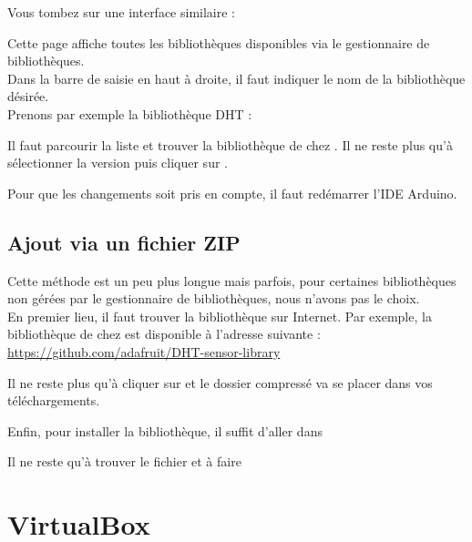 {  Vous tombez sur une interface similaire :


  Cette page affiche toutes les bibliothèques disponibles via le gestionnaire de bibliothèques.\\
  Dans la barre de saisie en haut à droite, il faut indiquer le nom de la bibliothèque désirée. \\
  Prenons par exemple la bibliothèque DHT :


  Il faut parcourir la liste et trouver la bibliothèque  de chez .
  Il ne reste plus qu'à sélectionner la version puis cliquer sur .

  Pour que les changements soit pris en compte, il faut redémarrer l'IDE  Arduino.


  \section{Ajout via un fichier ZIP}

  Cette méthode est un peu plus longue mais parfois, pour certaines bibliothèques non gérées par le gestionnaire de bibliothèques, nous n'avons pas le choix.\\

  En premier lieu, il faut trouver la bibliothèque sur Internet. Par exemple, la bibliothèque  de chez  est disponible à l'adresse suivante : 
  \url{https://github.com/adafruit/DHT-sensor-library}

  Il ne reste plus qu'à cliquer sur  et le dossier compressé va se placer dans vos téléchargements.\\



  Enfin, pour installer la bibliothèque, il suffit d'aller dans 
  
  
  Il ne reste qu'à trouver le fichier  et à faire 
  \chapter{VirtualBox}


}
